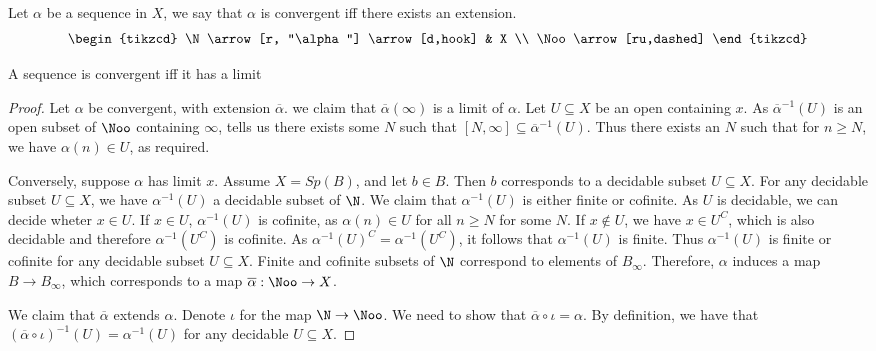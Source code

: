 \begin{definition}
  Let $\alpha$ be a sequence in $X$, we say that $\alpha$
  is convergent iff there exists an extension. 
  \begin{equation}\begin{tikzcd}
    \N \arrow[r, "\alpha"] \arrow[d,hook]  & X \\
    \Noo \arrow[ru,dashed]
  \end{tikzcd}\end{equation}  
\end{definition}  



\begin{proposition}
  A sequence is convergent iff it has a limit
\end{proposition}
\begin{proof}
  Let $\alpha$ be convergent, with extension $\overline \alpha$.
  we claim that $\overline \alpha(\infty)$ is a limit of $\alpha$.
  Let $U \subseteq X$ be an open containing $x$. 
  As $\overline\alpha^{-1}(U)$ is an open subset of $\Noo$ containing $\infty$,
   tells us there exists some $N$ such that $[N,\infty]\subseteq \overline \alpha^{-1}(U)$. 
  Thus there exists an $N$ such that for $n\geq N$, we have $\alpha(n) \in U$, as required. 

  Conversely, suppose $\alpha$ has limit $x$. 
  Assume $X = Sp(B)$, and let $b\in B$. Then $b$ corresponds to a decidable subset $U\subseteq X$.
  For any decidable subset $U \subseteq X$, we have 
  $\alpha^{-1}(U)$ a decidable subset of $\N$. 
  We claim that $\alpha^{-1}(U)$ is either finite or cofinite. 
  As $U$ is decidable, we can decide wheter $x\in U$. If $x\in U$, $\alpha^{-1}(U)$ is cofinite, as 
  $\alpha(n) \in U$ for all $n \geq N$ for some $N$. 
  If $x\notin U$, we have $x\in U^C$, which is also decidable and therefore $\alpha^{-1}(U^C)$ is cofinite. 
  As $\alpha^{-1}(U) ^ C = \alpha^{-1}(U^C)$, it follows that $\alpha^{-1}(U)$ is finite. 
  Thus $\alpha^{-1}(U)$ is finite or cofinite for any decidable subset $U\subseteq X$. 
  Finite and cofinite subsets of $\N$ correspond to elements of $B_\infty$. 
  Therefore, $\alpha$ induces a map $B \to B_\infty$, which corresponds to a map 
  $\overline \alpha: \Noo \to X$. 

  We claim that $\overline \alpha$ extends $\alpha$. 
  Denote $\iota$ for the map $\N \to \Noo$. 
  We need to show that $\overline \alpha \circ \iota = \alpha$. 
  By definition, we have that $(\overline \alpha \circ \iota)^{-1}(U) = \alpha^{-1}(U)$ 
  for any decidable $U\subseteq X$. 
\end{proof}

